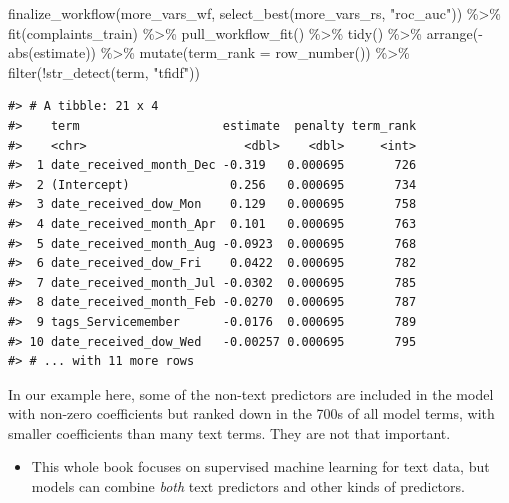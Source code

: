 \documentclass[
]{krantz}
\makeatletter
\newenvironment{Shaded}{\begin{snugshade}}{\end{snugshade}}
\newcommand{\AttributeTok}[1]{\textcolor[rgb]{0.77,0.63,0.00}{#1}}
\newcommand{\FunctionTok}[1]{\textcolor[rgb]{0.00,0.00,0.00}{#1}}
\newcommand{\NormalTok}[1]{#1}
\newcommand{\SpecialCharTok}[1]{\textcolor[rgb]{0.00,0.00,0.00}{#1}}
\newcommand{\StringTok}[1]{\textcolor[rgb]{0.31,0.60,0.02}{#1}}
\newenvironment{kframe}{%
\medskip{}
\setlength{\fboxsep}{.8em}
 \def\at@end@of@kframe{}%
 \ifinner\ifhmode%
  \def\at@end@of@kframe{\end{minipage}}%
  \begin{minipage}{\columnwidth}%
 \fi\fi%
 \def\FrameCommand##1{\hskip\@totalleftmargin \hskip-\fboxsep
 \colorbox{shadecolor}{##1}\hskip-\fboxsep
     \hskip-\linewidth \hskip-\@totalleftmargin \hskip\columnwidth}%
 \MakeFramed {\advance\hsize-\width
   \@totalleftmargin\z@ \linewidth\hsize
   \@setminipage}}%
 {\par\unskip\endMakeFramed%
 \at@end@of@kframe}
\renewenvironment{Shaded}{\begin{kframe}}{\end{kframe}}
\newenvironment{rmdblock}[1]
  {\begin{shaded*}
  \begin{itemize}[left = -1cm, labelsep = 1cm]
  \renewcommand{\labelitemi}{
    \raisebox{-.7\height}[0pt][0pt]{
      {\setkeys{Gin}{width=3em,keepaspectratio}\texttt{[image: images/\#1]}}
    }
  }
 
  \item
  }
  {
  \end{itemize}
  \end{shaded*}
  }
\newenvironment{rmdnote}
  {\begin{rmdblock}{note}}
  {\end{rmdblock}}
\makeatother
\begin{document}
\begin{Shaded}
\begin{Highlighting}[]
\FunctionTok{finalize\_workflow}\NormalTok{(more\_vars\_wf, }
                  \FunctionTok{select\_best}\NormalTok{(more\_vars\_rs, }\StringTok{"roc\_auc"}\NormalTok{)) }\SpecialCharTok{\%\textgreater{}\%}
  \FunctionTok{fit}\NormalTok{(complaints\_train) }\SpecialCharTok{\%\textgreater{}\%}
  \FunctionTok{pull\_workflow\_fit}\NormalTok{() }\SpecialCharTok{\%\textgreater{}\%}
  \FunctionTok{tidy}\NormalTok{() }\SpecialCharTok{\%\textgreater{}\%} 
  \FunctionTok{arrange}\NormalTok{(}\SpecialCharTok{{-}}\FunctionTok{abs}\NormalTok{(estimate)) }\SpecialCharTok{\%\textgreater{}\%} 
  \FunctionTok{mutate}\NormalTok{(}\AttributeTok{term\_rank =} \FunctionTok{row\_number}\NormalTok{()) }\SpecialCharTok{\%\textgreater{}\%} 
  \FunctionTok{filter}\NormalTok{(}\SpecialCharTok{!}\FunctionTok{str\_detect}\NormalTok{(term, }\StringTok{"tfidf"}\NormalTok{))}
\end{Highlighting}
\end{Shaded}

\begin{verbatim}
#> # A tibble: 21 x 4
#>    term                    estimate  penalty term_rank
#>    <chr>                      <dbl>    <dbl>     <int>
#>  1 date_received_month_Dec -0.319   0.000695       726
#>  2 (Intercept)              0.256   0.000695       734
#>  3 date_received_dow_Mon    0.129   0.000695       758
#>  4 date_received_month_Apr  0.101   0.000695       763
#>  5 date_received_month_Aug -0.0923  0.000695       768
#>  6 date_received_dow_Fri    0.0422  0.000695       782
#>  7 date_received_month_Jul -0.0302  0.000695       785
#>  8 date_received_month_Feb -0.0270  0.000695       787
#>  9 tags_Servicemember      -0.0176  0.000695       789
#> 10 date_received_dow_Wed   -0.00257 0.000695       795
#> # ... with 11 more rows
\end{verbatim}

In our example here, some of the non-text predictors are included in the model with non-zero coefficients but ranked down in the 700s of all model terms, with smaller coefficients than many text terms. They are not that important.

\begin{rmdnote}
This whole book focuses on supervised machine learning for text data,
but models can combine \emph{both} text predictors and other kinds of
predictors.
\end{rmdnote}
\end{document}
